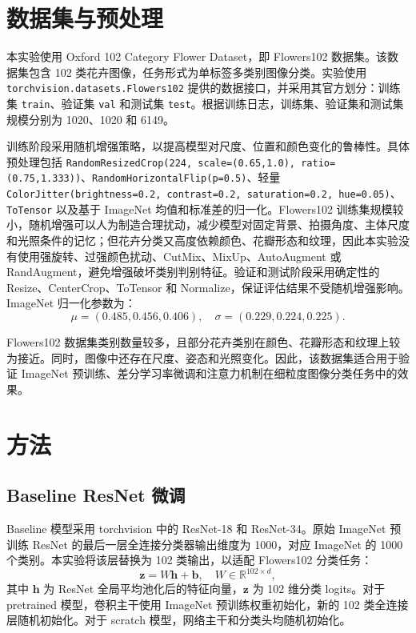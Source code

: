 \documentclass[UTF8]{ctexart}
\begin{document}
\section{数据集与预处理}
本实验使用 Oxford 102 Category Flower Dataset，即 Flowers102 数据集。该数据集包含 102 类花卉图像，任务形式为单标签多类别图像分类。实验使用 \verb|torchvision.datasets.Flowers102| 提供的数据接口，并采用其官方划分：训练集 \verb|train|、验证集 \verb|val| 和测试集 \verb|test|。根据训练日志，训练集、验证集和测试集规模分别为 1020、1020 和 6149。

训练阶段采用随机增强策略，以提高模型对尺度、位置和颜色变化的鲁棒性。具体预处理包括 \texttt{RandomResizedCrop(224, scale=(0.65,1.0), ratio=(0.75,1.333))}、\texttt{RandomHorizontalFlip(p=0.5)}、轻量 \texttt{ColorJitter(brightness=0.2, contrast=0.2, saturation=0.2, hue=0.05)}、\texttt{ToTensor} 以及基于 ImageNet 均值和标准差的归一化。Flowers102 训练集规模较小，随机增强可以人为制造合理扰动，减少模型对固定背景、拍摄角度、主体尺度和光照条件的记忆；但花卉分类又高度依赖颜色、花瓣形态和纹理，因此本实验没有使用强旋转、过强颜色扰动、CutMix、MixUp、AutoAugment 或 RandAugment，避免增强破坏类别判别特征。验证和测试阶段采用确定性的 Resize、CenterCrop、ToTensor 和 Normalize，保证评估结果不受随机增强影响。ImageNet 归一化参数为：
\begin{equation}
\mu=(0.485,0.456,0.406), \quad \sigma=(0.229,0.224,0.225).
\label{eq:imagenet-normalization}
\end{equation}

Flowers102 数据集类别数量较多，且部分花卉类别在颜色、花瓣形态和纹理上较为接近。同时，图像中还存在尺度、姿态和光照变化。因此，该数据集适合用于验证 ImageNet 预训练、差分学习率微调和注意力机制在细粒度图像分类任务中的效果。

\section{方法}
\subsection{Baseline ResNet 微调}
Baseline 模型采用 torchvision 中的 ResNet-18 和 ResNet-34。原始 ImageNet 预训练 ResNet 的最后一层全连接分类器输出维度为 1000，对应 ImageNet 的 1000 个类别。本实验将该层替换为 102 类输出，以适配 Flowers102 分类任务：
\begin{equation}
\mathbf{z}=W\mathbf{h}+\mathbf{b}, \quad W\in\mathbb{R}^{102\times d},
\label{eq:classifier}
\end{equation}
其中 \(\mathbf{h}\) 为 ResNet 全局平均池化后的特征向量，\(\mathbf{z}\) 为 102 维分类 logits。对于 pretrained 模型，卷积主干使用 ImageNet 预训练权重初始化，新的 102 类全连接层随机初始化。对于 scratch 模型，网络主干和分类头均随机初始化。
\end{document}
